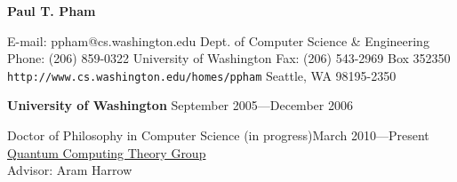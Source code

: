 \documentclass[letter]{article}
\begin{document}
\thispagestyle{empty}           %

\reversemarginpar		%

{\LARGE {\bf Paul T. Pham}}
\par
\vspace{.25in}
E-mail: ppham@cs.washington.edu
\hspace*{\fill}
Dept. of Computer Science \& Engineering
\linebreak
Phone: (206) 859-0322
\hspace*{\fill}
University of Washington
\linebreak
Fax: (206) 543-2969
\hspace*{\fill}
Box 352350
\linebreak
\texttt{http://www.cs.washington.edu/homes/ppham}
\hspace*{\fill}
Seattle, WA 98195-2350

\par
\vspace{.25in}

{\bf University of Washington} \hspace*{\fill}September 2005---December 2006
\par
Doctor of Philosophy in Computer Science (in progress)\hspace*{\fill}March 2010---Present\\
\href{http://quantum.cs.washington.edu}{Quantum Computing Theory Group}\\
Advisor: Aram Harrow
\vspace{\baselineskip}
\par
\end{document}
